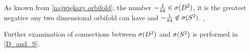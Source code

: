 As known from \ref{największy orbifold}, the number $-\frac{1}{84}\in{{\sigma}(D^2)}$, it is 
the greatest negative 
\Eoc any two dimensional orbifold can have and $-\frac{1}{84}\not\in{{\sigma}(S^2)}$. 
$_\square$  

Further examination of connections between ${{\sigma}(D^2)}$ and ${{\sigma}(S^2)}$ is performed in \ref{D_and_S}.






